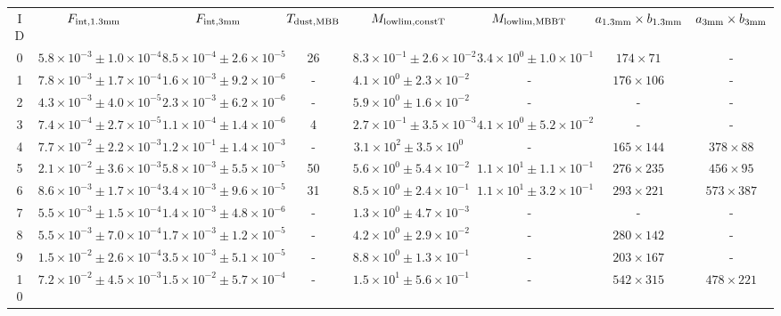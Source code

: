 \begin{table}
\begin{tabular}{cccccccc}
ID & $F_{\rm int, 1.3mm}$ & $F_{\rm int, 3mm}$ & $T_{\rm dust, MBB}$ & $M_{\rm lowlim, constT}$ & $M_{\rm lowlim, MBBT}$ & $a_{\rm 1.3mm}\times b_{\rm 1.3mm}$ & $a_{\rm 3mm}\times b_{\rm 3mm}$ \\
0 & $5.8\times10^{-3}\pm 1.0\times10^{-4}$ & $8.5\times10^{-4}\pm 2.6\times10^{-5}$ & 26 & $8.3\times10^{-1}\pm 2.6\times10^{-2}$ & $3.4\times10^{0}\pm 1.0\times10^{-1}$ & $174\times 71$ & - \\
1 & $7.8\times10^{-3}\pm 1.7\times10^{-4}$ & $1.6\times10^{-3}\pm 9.2\times10^{-6}$ & - & $4.1\times10^{0}\pm 2.3\times10^{-2}$ & - & $176\times 106$ & - \\
2 & $4.3\times10^{-3}\pm 4.0\times10^{-5}$ & $2.3\times10^{-3}\pm 6.2\times10^{-6}$ & - & $5.9\times10^{0}\pm 1.6\times10^{-2}$ & - & - & - \\
3 & $7.4\times10^{-4}\pm 2.7\times10^{-5}$ & $1.1\times10^{-4}\pm 1.4\times10^{-6}$ & 4 & $2.7\times10^{-1}\pm 3.5\times10^{-3}$ & $4.1\times10^{0}\pm 5.2\times10^{-2}$ & - & - \\
4 & $7.7\times10^{-2}\pm 2.2\times10^{-3}$ & $1.2\times10^{-1}\pm 1.4\times10^{-3}$ & - & $3.1\times10^{2}\pm 3.5\times10^{0}$ & - & $165\times 144$ & $378\times 88$ \\
5 & $2.1\times10^{-2}\pm 3.6\times10^{-3}$ & $5.8\times10^{-3}\pm 5.5\times10^{-5}$ & 50 & $5.6\times10^{0}\pm 5.4\times10^{-2}$ & $1.1\times10^{1}\pm 1.1\times10^{-1}$ & $276\times 235$ & $456\times 95$ \\
6 & $8.6\times10^{-3}\pm 1.7\times10^{-4}$ & $3.4\times10^{-3}\pm 9.6\times10^{-5}$ & 31 & $8.5\times10^{0}\pm 2.4\times10^{-1}$ & $1.1\times10^{1}\pm 3.2\times10^{-1}$ & $293\times 221$ & $573\times 387$ \\
7 & $5.5\times10^{-3}\pm 1.5\times10^{-4}$ & $1.4\times10^{-3}\pm 4.8\times10^{-6}$ & - & $1.3\times10^{0}\pm 4.7\times10^{-3}$ & - & - & - \\
8 & $5.5\times10^{-3}\pm 7.0\times10^{-4}$ & $1.7\times10^{-3}\pm 1.2\times10^{-5}$ & - & $4.2\times10^{0}\pm 2.9\times10^{-2}$ & - & $280\times 142$ & - \\
9 & $1.5\times10^{-2}\pm 2.6\times10^{-4}$ & $3.5\times10^{-3}\pm 5.1\times10^{-5}$ & - & $8.8\times10^{0}\pm 1.3\times10^{-1}$ & - & $203\times 167$ & - \\
10 & $7.2\times10^{-2}\pm 4.5\times10^{-3}$ & $1.5\times10^{-2}\pm 5.7\times10^{-4}$ & - & $1.5\times10^{1}\pm 5.6\times10^{-1}$ & - & $542\times 315$ & $478\times 221$ \\

\end{tabular}
\end{table}
